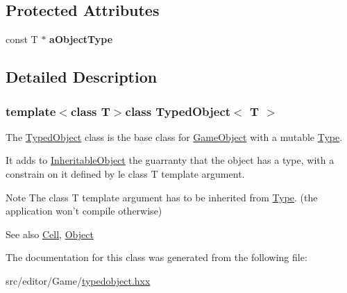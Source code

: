 \subsection*{\-Protected \-Attributes}
\begin{DoxyCompactItemize}
\item 
\hypertarget{class_typed_object_abcc7402b391c4831a78a008ecd37d937}{const \-T $\ast$ {\bfseries a\-Object\-Type}}\label{class_typed_object_abcc7402b391c4831a78a008ecd37d937}

\end{DoxyCompactItemize}


\subsection{\-Detailed \-Description}
\subsubsection*{template$<$class \-T$>$class Typed\-Object$<$ T $>$}

\-The \hyperlink{class_typed_object}{\-Typed\-Object} class is the base class for \hyperlink{class_game_object}{\-Game\-Object} with a mutable \hyperlink{class_type}{\-Type}. 

\-It adds to \hyperlink{class_inheritable_object}{\-Inheritable\-Object} the guarranty that the object has a type, with a constrain on it defined by le {\ttfamily class} {\ttfamily \-T} template argument.

\begin{DoxyNote}{\-Note}
\-The {\ttfamily class} {\ttfamily \-T} template argument has to be inherited from \hyperlink{class_type}{\-Type}. (the application won't compile otherwise)
\end{DoxyNote}
\begin{DoxySeeAlso}{\-See also}
\hyperlink{class_cell}{\-Cell}, \hyperlink{class_object}{\-Object} 
\end{DoxySeeAlso}


\-The documentation for this class was generated from the following file\-:\begin{DoxyCompactItemize}
\item 
src/editor/\-Game/\hyperlink{typedobject_8hxx}{typedobject.\-hxx}\end{DoxyCompactItemize}
